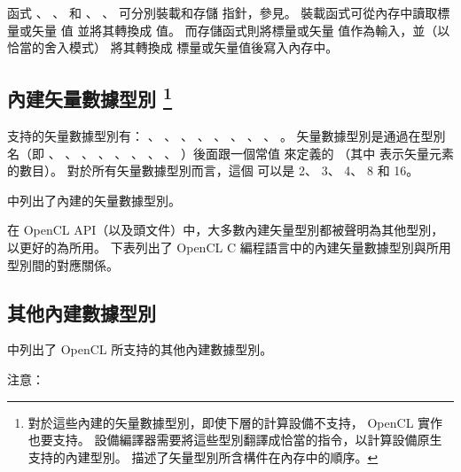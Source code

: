 函式 、 、 
 和 、 、 
 可分別裝載和存儲  指針，參見。
裝載函式可從內存中讀取標量或矢量  值 並將其轉換成  值。
而存儲函式則將標量或矢量  值作為輸入，並（以恰當的舍入模式）
將其轉換成  標量或矢量值後寫入內存中。


\subsection[sec:bivdt]{內建矢量數據型別
\footnote{對於這些內建的矢量數據型別，即使下層的計算設備不支持， OpenCL 實作也要支持。
設備編譯器需要將這些型別翻譯成恰當的指令，以計算設備原生支持的內建型別。
 描述了矢量型別所含構件在內存中的順序。}}

支持的矢量數據型別有： 、 、 、
 、 、 、
 、 、 。
矢量數據型別是通過在型別名（即 、 、 、
 、 、 、 、 、
 ）後面跟一個常值  來定義的
（其中  表示矢量元素的數目）。
對於所有矢量數據型別而言，這個  可以是 2、 3、 4、 8 和 16。

中列出了內建的矢量數據型別。

{}

在 OpenCL API（以及頭文件）中，大多數內建矢量型別都被聲明為其他型別，
以更好的為所用。
下表列出了 OpenCL C 編程語言中的內建矢量數據型別與所用型別間的對應關係。



\subsection[sec:obidt]{其他內建數據型別}

中列出了 OpenCL 所支持的其他內建數據型別。

{}

注意：

